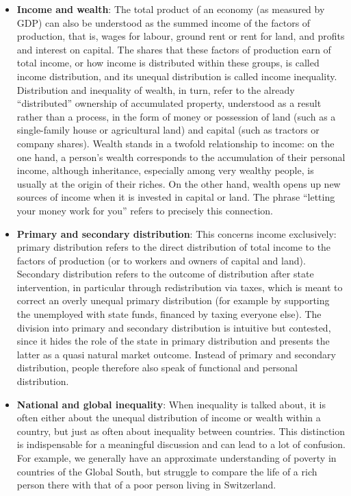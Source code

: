 \documentclass[
  british,
  a4paper,
  DIV=11,
  numbers=noendperiod,
  oneside,
  openany]{scrreprt}
\begin{document}
\begin{itemize}
\item
  \textbf{Income and wealth}: The total product of an economy (as
  measured by GDP) can also be understood as the summed income of the
  factors of production, that is, wages for labour, ground rent or rent
  for land, and profits and interest on capital. The shares that these
  factors of production earn of total income, or how income is
  distributed within these groups, is called income distribution, and
  its unequal distribution is called income inequality. Distribution and
  inequality of wealth, in turn, refer to the already ``distributed''
  ownership of accumulated property, understood as a result rather than
  a process, in the form of money or possession of land (such as a
  single-family house or agricultural land) and capital (such as
  tractors or company shares). Wealth stands in a twofold relationship
  to income: on the one hand, a person's wealth corresponds to the
  accumulation of their personal income, although inheritance,
  especially among very wealthy people, is usually at the origin of
  their riches. On the other hand, wealth opens up new sources of income
  when it is invested in capital or land. The phrase ``letting your
  money work for you'' refers to precisely this connection.
\item
  \textbf{Primary and secondary distribution}: This concerns income
  exclusively: primary distribution refers to the direct distribution of
  total income to the factors of production (or to workers and owners of
  capital and land). Secondary distribution refers to the outcome of
  distribution after state intervention, in particular through
  redistribution via taxes, which is meant to correct an overly unequal
  primary distribution (for example by supporting the unemployed with
  state funds, financed by taxing everyone else). The division into
  primary and secondary distribution is intuitive but contested, since
  it hides the role of the state in primary distribution and presents
  the latter as a quasi natural market outcome. Instead of primary and
  secondary distribution, people therefore also speak of functional and
  personal distribution.
\item
  \textbf{National and global inequality}: When inequality is talked
  about, it is often either about the unequal distribution of income or
  wealth within a country, but just as often about inequality between
  countries. This distinction is indispensable for a meaningful
  discussion and can lead to a lot of confusion. For example, we
  generally have an approximate understanding of poverty in countries of
  the Global South, but struggle to compare the life of a rich person
  there with that of a poor person living in Switzerland.
\end{itemize}
\end{document}
